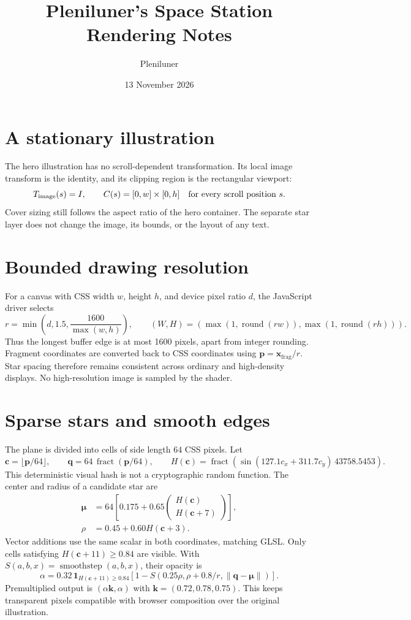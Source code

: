 \documentclass[11pt]{article}
\title{Pleniluner's Space Station\\Rendering Notes}
\author{Pleniluner}
\date{13 November 2026}
\begin{document}
\maketitle

\section{A stationary illustration}
The hero illustration has no scroll-dependent transformation. Its local image
transform is the identity, and its clipping region is the rectangular viewport:
\[
 T_{\mathrm{image}}(s)=I,\qquad C(s)=[0,w]\times[0,h]
 \quad\hbox{for every scroll position }s.
\]
Cover sizing still follows the aspect ratio of the hero container. The separate
star layer does not change the image, its bounds, or the layout of any text.

\section{Bounded drawing resolution}
For a canvas with CSS width $w$, height $h$, and device pixel ratio $d$, the
JavaScript driver selects
\[
 r=\min\left(d,1.5,\frac{1600}{\max(w,h)}\right),\qquad
 (W,H)=\left(\max(1,\operatorname{round}(rw)),
              \max(1,\operatorname{round}(rh))\right).
\]
Thus the longest buffer edge is at most 1600 pixels, apart from integer
rounding. Fragment coordinates are converted back to CSS coordinates using
$\mathbf{p}=\mathbf{x}_{\mathrm{frag}}/r$. Star spacing therefore remains
consistent across ordinary and high-density displays. No high-resolution image
is sampled by the shader.

\section{Sparse stars and smooth edges}
The plane is divided into cells of side length $64$ CSS pixels. Let
\[
 \mathbf{c}=\lfloor\mathbf{p}/64\rfloor,\qquad
 \mathbf{q}=64\,\operatorname{fract}(\mathbf{p}/64),\qquad
 H(\mathbf{c})=\operatorname{fract}\left(
 \sin(127.1c_x+311.7c_y)\,43758.5453\right).
\]
This deterministic visual hash is not a cryptographic random function.
The center and radius of a candidate star are
\begin{align*}
 \boldsymbol{\mu}&=64\left[0.175+0.65
   \begin{pmatrix}H(\mathbf{c})\\H(\mathbf{c}+7)\end{pmatrix}\right],\\
 \rho&=0.45+0.60H(\mathbf{c}+3).
\end{align*}
Vector additions use the same scalar in both coordinates, matching GLSL.
Only cells satisfying $H(\mathbf{c}+11)\geq0.84$ are visible. With
$S(a,b,x)=\operatorname{smoothstep}(a,b,x)$, their opacity is
\[
 \alpha=0.32\,\mathbf{1}_{H(\mathbf{c}+11)\geq0.84}
 \left[1-S\left(0.25\rho,\rho+0.8/r,
                  \lVert\mathbf{q}-\boldsymbol{\mu}\rVert\right)\right].
\]
Premultiplied output is $(\alpha\mathbf{k},\alpha)$ with
$\mathbf{k}=(0.72,0.78,0.75)$. This keeps transparent pixels compatible with
browser composition over the original illustration.
\end{document}
